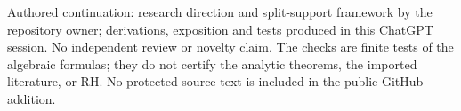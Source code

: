 \documentclass[
]{article}
\begin{document}
Authored continuation: research direction and split-support framework by
the repository owner; derivations, exposition and tests produced in this
ChatGPT session. No independent review or novelty claim. The checks are
finite tests of the algebraic formulas; they do not certify the analytic
theorems, the imported literature, or RH. No protected source text is
included in the public GitHub addition.
\end{document}
